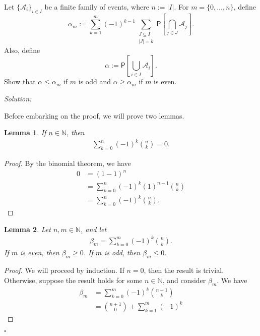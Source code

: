 \documentclass[12pt]{article}
\newcommand{\NN}{\mathbb{N}}
\newcommand{\A}{\mathcal{A}}
\newcommand{\prob}{\mathsf{P}}
\newcommand{\pr}[1]{\prob\left[#1\right]}
\newenvironment{problem}[2][Problem]{\begin{trivlist}
\item[\hskip \labelsep {\bfseries #1}\hskip \labelsep {\bfseries #2.}]}{\end{trivlist}}
\newenvironment{sol}
    {\emph{Solution:}
    }
    {
    $\square$
    }
\newtheorem{lemma}{Lemma}
\begin{document}
\begin{problem}{8.4}
    Let $\{\A_i\}_{i\in I}$ be a finite family of events, where $n:=|I|$. For $m=\{0,\dots,n\}$, define 
    \begin{equation*}
        \alpha_m := \sum_{k=1}^m (-1)^{k-1} \sum_{\substack{J\subseteq I \\ |J|=k}}
        \pr{\bigcap_{j\in J}\A_j}.
    \end{equation*}
    Also, define
    \begin{equation*}
        \alpha := \pr{\bigcup_{i\in I}\A_i}.
    \end{equation*}
    Show that $\alpha\leq \alpha_m$ if $m$ is odd and $\alpha\geq \alpha_m$ if $m$ is even.
\end{problem}
\begin{sol}
    Before embarking on the proof, we will prove two lemmas.
    \begin{lemma}
        If $n\in\NN$, then 
        \begin{align*}
            \sum_{k=0}^n (-1)^k \binom{n}{k} = 0.
        \end{align*}
    \end{lemma}
    \begin{proof}
        By the binomial theorem, we have
        \begin{align*}
            0 &= (1-1)^n \\
            &= \sum_{k=0}^n (-1)^k (1)^{n-1}\binom{n}{k} \\
            &= \sum_{k=0}^n (-1)^k \binom{n}{k}.
        \end{align*}
    \end{proof}
    \begin{lemma}
        Let $n,m\in\NN$, and let
        \begin{align*}
            \beta_m = \sum_{k=0}^{m} (-1)^k \binom{n}{k}.
        \end{align*}
        \indent If $m$ is even, then $\beta_m \geq 0$. If $m$ is odd, then $\beta_m \leq 0$.
    \end{lemma}
    \begin{proof}
        \indent We will proceed by induction. If $n=0$, then the result is trivial. \\
        \indent Otherwise, suppose the result holds for some $n\in\NN$, and consider $\beta_m$. We have
        \begin{align*}
            \beta_m &= \sum_{k=0}^m (-1)^k \binom{n+1}{k} \\
            &= \binom{n+1}{0} + \sum_{k=1}^m (-1)^k 

\end{align*}
\end{proof}
\end{sol}
\end{document}
